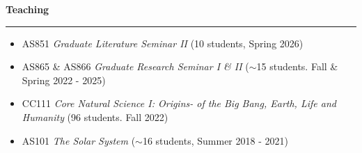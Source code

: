 \documentclass[12pt]{report}
\begin{document}
\noindent \bf{Teaching}\rm \hspace*{\fill} \\
\rule{\textwidth}{1pt}
\begin{itemize} \itemsep -2pt %
	\item AS851 \textit{Graduate Literature Seminar II} (10 students, Spring 2026)
	\item AS865 \& AS866 \textit{ Graduate Research Seminar I \& II}  ($\sim$15 students. Fall \& Spring 2022 - 2025)
	\item CC111 \textit{Core Natural Science I: Origins- of the Big Bang, Earth, Life and Humanity} (96 students. Fall 2022)
	\item AS101 \textit{The Solar System}  ($\sim$16 students, Summer 2018 - 2021)
 \end{itemize}



   
\end{document}
